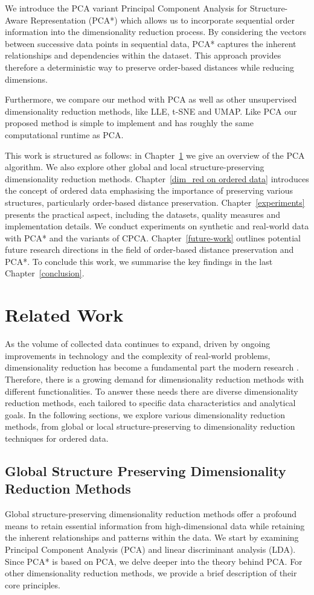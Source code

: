 \documentclass[pdftex,12pt,a4paper]{report}
\begin{document}
We introduce the PCA variant Principal Component Analysis for Structure-Aware Representation (PCA*) which allows us to incorporate sequential order information into the dimensionality reduction process.
By considering the vectors between successive data points in sequential data, PCA* captures the inherent relationships and dependencies within the dataset.
This approach provides therefore a deterministic way to preserve order-based distances while reducing dimensions.

Furthermore, we compare our method with PCA as well as other unsupervised dimensionality reduction methods, like LLE, t-SNE and UMAP.
Like PCA our proposed method is simple to implement and has roughly the same computational runtime as PCA.

This work is structured as follows:
in Chapter~\ref{related-work} we give an overview of the PCA algorithm.
We also explore other global and local structure-preserving dimensionality reduction methods.
Chapter~\ref{dim_red on ordered data} introduces the concept of ordered data emphasising the importance of preserving various structures, particularly order-based distance preservation.
Chapter~\ref{experiments} presents the practical aspect, including the datasets, quality measures and implementation details.
We conduct experiments on synthetic and real-world data with PCA* and the variants of CPCA.
Chapter~\ref{future-work} outlines potential future research directions in the field of order-based distance preservation and PCA*.
To conclude this work, we summarise the key findings in the last Chapter~\ref{conclusion}.


\chapter{Related Work} \label{related-work}
As the volume of collected data continues to expand, driven by ongoing improvements in technology and the complexity of real-world problems, dimensionality reduction has become a fundamental part the modern research \cite{dimensionality-curse}.
Therefore, there is a growing demand for dimensionality reduction methods with different functionalities.
To answer these needs there are diverse dimensionality reduction methods, each tailored to specific data characteristics and analytical goals.
In the following sections, we explore various dimensionality reduction methods, from global or local structure-preserving to dimensionality reduction techniques for ordered data.

\section{Global Structure Preserving Dimensionality Reduction Methods}
Global structure-preserving dimensionality reduction methods offer a profound means to retain essential information from high-dimensional data while retaining the inherent relationships and patterns within the data.
We start by examining Principal Component Analysis (PCA) and linear discriminant analysis (LDA).
Since PCA* is based on PCA, we delve deeper into the theory behind PCA. 
For other dimensionality reduction methods, we provide a brief description of their core principles.
\end{document}
